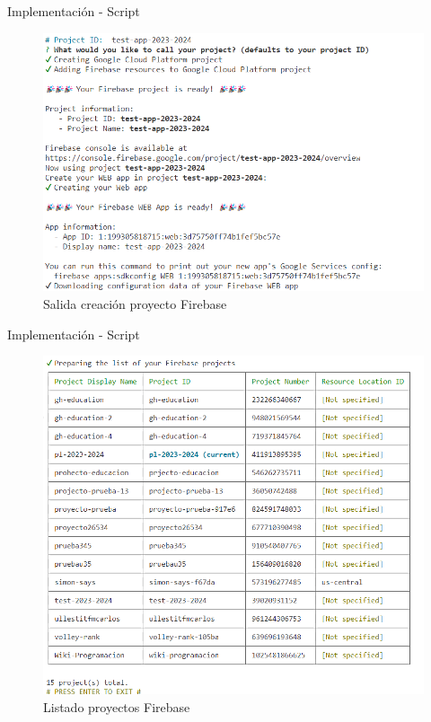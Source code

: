 \documentclass{beamer}
\begin{document}
    \begin{frame}{Implementación - Script}

        \begin{center}  
            \begin{figure}
                \includegraphics[width=.9\textwidth]{Presentacion/implementacion/script/create-firebase-project.png}
                \caption{Salida creación proyecto Firebase}
            \end{figure}            
        \end{center}
        
        
    \end{frame} 

    \begin{frame}{Implementación - Script}

        \begin{center}  
            \begin{figure}
                \includegraphics[width=.7\textwidth]{Presentacion/implementacion/script/firebase-list.png}
                \caption{Listado proyectos Firebase}
            \end{figure}            
        \end{center}
        
        
    \end{frame}  
\end{document}
